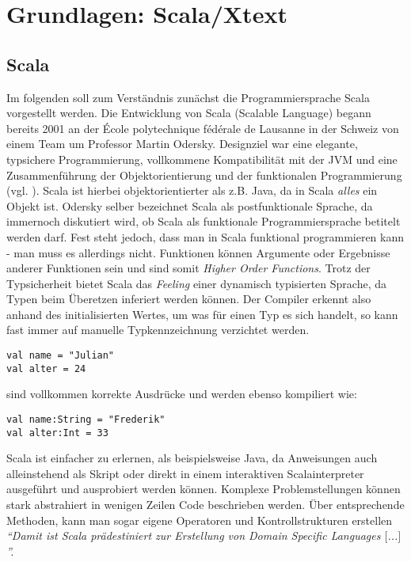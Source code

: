\chapter{Grundlagen: Scala/Xtext}
\section{Scala}
Im folgenden soll zum Verständnis zunächst die Programmiersprache Scala vorgestellt werden.
Die Entwicklung von Scala (Scalable Language) begann bereits 2001 an der École polytechnique fédérale de Lausanne in der Schweiz von einem Team um Professor Martin Odersky. Designziel war eine elegante, typsichere Programmierung, vollkommene Kompatibilität mit der JVM und eine Zusammenführung der Objektorientierung und der funktionalen Programmierung (vgl. \cite{braun:scala}). Scala ist hierbei objektorientierter als z.B. Java, da in Scala \textit{alles} ein Objekt ist. Odersky selber bezeichnet Scala als postfunktionale Sprache, da immernoch diskutiert wird, ob Scala als funktionale Programmiersprache betitelt werden darf. Fest steht jedoch, dass man in Scala funktional programmieren kann - man muss es allerdings nicht. Funktionen können Argumente oder Ergebnisse anderer Funktionen sein und sind somit \textit{Higher Order Functions}. Trotz der Typsicherheit bietet Scala das \textit{Feeling} einer dynamisch typisierten Sprache, da Typen beim Überetzen inferiert werden können. Der Compiler erkennt also anhand des initialisierten Wertes, um was für einen Typ es sich handelt, so kann fast immer auf manuelle Typkennzeichnung verzichtet werden.
\begin{lstlisting}[style = scala]
val name = "Julian"
val alter = 24
\end{lstlisting}
sind vollkommen korrekte Ausdrücke und werden ebenso kompiliert wie:
\begin{lstlisting}[style = scala]
val name:String = "Frederik"
val alter:Int = 33
\end{lstlisting}
Scala ist einfacher zu erlernen, als beispielsweise Java, da Anweisungen auch alleinstehend als Skript oder direkt in einem interaktiven Scalainterpreter ausgeführt und ausprobiert werden können. 
Komplexe Problemstellungen können stark abstrahiert in wenigen Zeilen Code beschrieben werden. Über entsprechende Methoden, kann man sogar eigene Operatoren und Kontrollstrukturen erstellen \textit{"`Damit ist Scala prädestiniert zur Erstellung von Domain Specific Languages $[$...$]$"'.} \citet[p. 2]{braun:scala}
